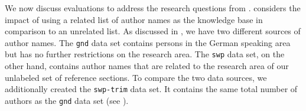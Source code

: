 
\bigskip

We now discuss evaluations to address the research questions from .
 considers the impact of using a related list of author names as the knowledge base in comparison to an unrelated list.
As discussed in , we have two different sources of author names.
The \texttt{gnd} data set contains persons in the German speaking area but has no further restrictions on the research area.
The \texttt{swp} data set, on the other hand, contains author names that are related to the research area of our unlabeled set of reference sections.
To compare the two data sources, we additionally created the \texttt{swp-trim} data set.
It contains the same total number of authors as the \texttt{gnd} data set (see ).












